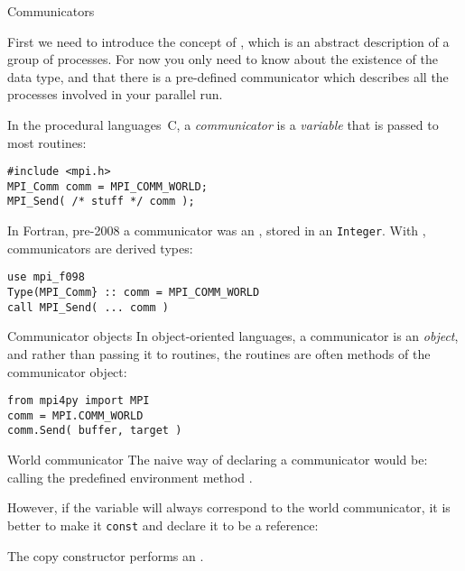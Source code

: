  {Communicators}

First we need to introduce the concept of
, which is an abstract description of a
group of processes. For now you only need to know about the existence
of the  data type, and that there is a
pre-defined communicator  which
describes all the processes involved in your parallel run.


In the procedural languages~C,
a \emph{communicator} is a \emph{variable}
that is passed to most routines:
\begin{lstlisting}
#include <mpi.h>
MPI_Comm comm = MPI_COMM_WORLD;
MPI_Send( /* stuff */ comm );
\end{lstlisting}

\begin{fortrannote}
  In Fortran, pre-2008 a communicator was an ,
  stored in an \lstinline{Integer}. With ,
  communicators are derived types:
\begin{lstlisting}
use mpi_f098
Type(MPI_Comm} :: comm = MPI_COMM_WORLD
call MPI_Send( ... comm )
\end{lstlisting}
\end{fortrannote}

\begin{pythonnote}{Communicator objects}
In object-oriented languages, a communicator is an
\emph{object},
and rather than passing it to routines,
the routines are often methods of the communicator object:
\begin{lstlisting}
from mpi4py import MPI
comm = MPI.COMM_WORLD
comm.Send( buffer, target )
\end{lstlisting}
\end{pythonnote}

\begin{mplnote}{World communicator}
  The naive way of declaring a communicator would be:
  calling the predefined environment method .

  However, if the variable will always correspond to the world communicator,
  it is better to make it \lstinline{const} and declare it to be a reference:

  \begin{mplimpl}
    The copy constructor performs an .
  \end{mplimpl}
\end{mplnote}

